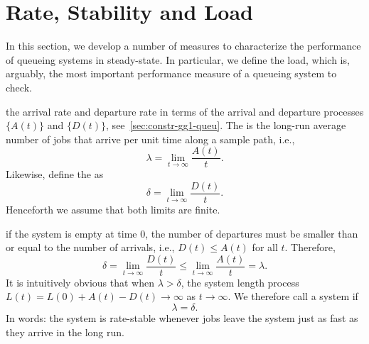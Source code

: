 


\section{Rate, Stability and Load}
\label{sec:rate-stability}



In this section, we develop a number of measures to characterize the performance of queueing systems in steady-state.
In particular, we define the load, which is, arguably, the most important performance measure of a queueing system to check.




 the arrival rate and departure rate in terms of the arrival and departure processes $\{A(t)\}$ and $\{D(t)\}$, see~\cref{sec:constr-gg1-queu}.
The  is the long-run average number of jobs that arrive per unit time along a sample path, i.e.,
\begin{equation}\label{eq:3}
 \lambda = \lim_{t\to\infty} \frac{A(t)}t.
\end{equation}
Likewise, define the  as
\begin{equation}\label{eq:28}
 \delta = \lim_{t\to\infty} \frac{D(t)}t.
\end{equation}
Henceforth we assume that both limits are finite. 

 if the system is empty at time $0$,
 the number of departures must be smaller than or equal to the number of arrivals, i.e., $D(t) \leq A(t)$ for all $t$.
Therefore,
\begin{equation*}
\delta = \lim_{t\to\infty} \frac{D(t)}t \leq \lim_{t\to\infty} \frac{A(t)}t = \lambda.
\end{equation*}
It is intuitively obvious that when $\lambda > \delta$, the system length process $L(t)=L(0)+A(t) - D(t) \to \infty$ as $t\to \infty$.
We therefore call a system  if
\begin{equation}\label{eq:84}
 \lambda = \delta.
\end{equation}
In  words: the system is rate-stable whenever jobs leave the system just as fast as they arrive in the long run.

